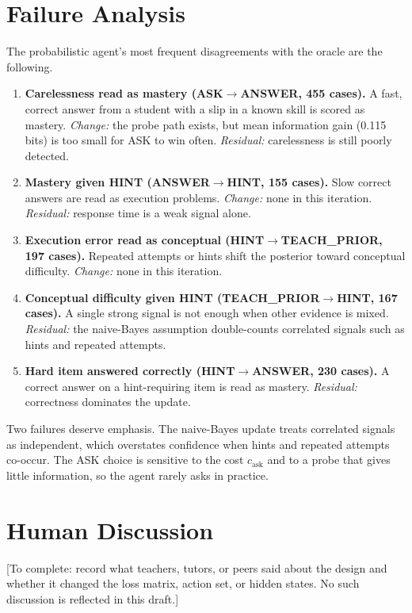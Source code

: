 \documentclass[10pt,letterpaper,twocolumn]{article}
\begin{document}
\section{Failure Analysis}
The probabilistic agent's most frequent disagreements with the oracle are the following.
\begin{enumerate}
\item \textbf{Carelessness read as mastery (ASK$\rightarrow$ANSWER, 455 cases).} A fast, correct answer from a student with a slip in a known skill is scored as mastery. \emph{Change:} the probe path exists, but mean information gain (0.115 bits) is too small for ASK to win often. \emph{Residual:} carelessness is still poorly detected.
\item \textbf{Mastery given HINT (ANSWER$\rightarrow$HINT, 155 cases).} Slow correct answers are read as execution problems. \emph{Change:} none in this iteration. \emph{Residual:} response time is a weak signal alone.
\item \textbf{Execution error read as conceptual (HINT$\rightarrow$TEACH\_PRIOR, 197 cases).} Repeated attempts or hints shift the posterior toward conceptual difficulty. \emph{Change:} none in this iteration.
\item \textbf{Conceptual difficulty given HINT (TEACH\_PRIOR$\rightarrow$HINT, 167 cases).} A single strong signal is not enough when other evidence is mixed. \emph{Residual:} the naive-Bayes assumption double-counts correlated signals such as hints and repeated attempts.
\item \textbf{Hard item answered correctly (HINT$\rightarrow$ANSWER, 230 cases).} A correct answer on a hint-requiring item is read as mastery. \emph{Residual:} correctness dominates the update.
\end{enumerate}

Two failures deserve emphasis. The naive-Bayes update treats correlated signals as independent, which overstates confidence when hints and repeated attempts co-occur. The ASK choice is sensitive to the cost $c_{\text{ask}}$ and to a probe that gives little information, so the agent rarely asks in practice.

\section{Human Discussion}
[To complete: record what teachers, tutors, or peers said about the design and whether it changed the loss matrix, action set, or hidden states. No such discussion is reflected in this draft.]
\end{document}
